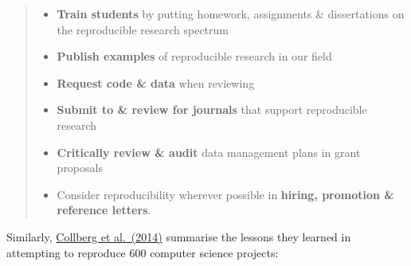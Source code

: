 \documentclass[
]{book}
\providecommand{\tightlist}{%
  \setlength{\itemsep}{0pt}\setlength{\parskip}{0pt}}
\begin{document}
\begin{quote}
\begin{itemize}
\tightlist
\item
  \textbf{Train students} by putting homework, assignments \& dissertations on the reproducible research spectrum
\item
  \textbf{Publish examples} of reproducible research in our field
\item
  \textbf{Request code \& data} when reviewing
\item
  \textbf{Submit to \& review for journals} that support reproducible research
\item
  \textbf{Critically review \& audit} data management plans in grant proposals
\item
  Consider reproducibility wherever possible in \textbf{hiring, promotion \& reference letters}.
\end{itemize}
\end{quote}

Similarly, \href{http://reproducibility.cs.arizona.edu/tr.pdf}{Collberg et al.~(2014)} summarise the lessons they learned in attempting to reproduce 600 computer science projects:
\end{document}
